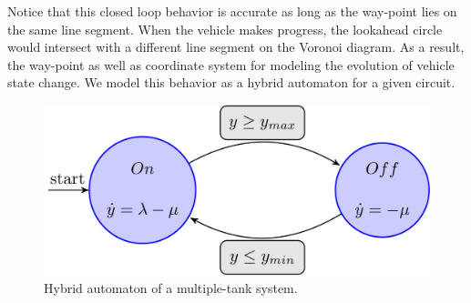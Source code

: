 
Notice that this closed loop behavior is accurate as long as the way-point lies on the same line segment.
%
When the vehicle makes progress, the lookahead circle would intersect with a different line segment on the Voronoi diagram.
%
As a result, the way-point as well as coordinate system for modeling the evolution of vehicle state change.
%
We model this behavior as a hybrid automaton for a given circuit.

\begin{figure}
\centering
\includegraphics[width=0.8\linewidth]{Figures/hybrid-automaton.jpeg}
\caption{Hybrid automaton of a multiple-tank system.}
\label{fig:ha}
\end{figure}

